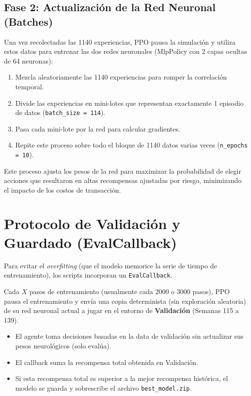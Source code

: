 \documentclass[12pt,a4paper]{article}
\begin{document}
\subsection{Fase 2: Actualización de la Red Neuronal (Batches)}
Una vez recolectadas las 1140 experiencias, PPO pausa la simulación y utiliza estos datos para entrenar las dos redes neuronales (MlpPolicy con 2 capas ocultas de 64 neuronas):
\begin{enumerate}
    \item Mezcla aleatoriamente las 1140 experiencias para romper la correlación temporal.
    \item Divide las experiencias en mini-lotes que representan exactamente 1 episodio de datos (\texttt{batch\_size = 114}).
    \item Pasa cada mini-lote por la red para calcular gradientes.
    \item Repite este proceso sobre todo el bloque de 1140 datos varias veces (\texttt{n\_epochs = 10}).
\end{enumerate}
Este proceso ajusta los pesos de la red para maximizar la probabilidad de elegir acciones que resultaron en altas recompensas ajustadas por riesgo, minimizando el impacto de los costos de transacción.

\section{Protocolo de Validación y Guardado (EvalCallback)}

Para evitar el \textit{overfitting} (que el modelo memorice la serie de tiempo de entrenamiento), los scripts incorporan un \texttt{EvalCallback}.

Cada $X$ pasos de entrenamiento (usualmente cada 2000 o 3000 pasos), PPO pausa el entrenamiento y envía una copia determinista (sin exploración aleatoria) de su red neuronal actual a jugar en el entorno de \textbf{Validación} (Semanas 115 a 139).

\begin{itemize}
    \item El agente toma decisiones basadas en la data de validación sin actualizar sus pesos neurológicos (solo evalúa).
    \item El callback suma la recompensa total obtenida en Validación.
    \item Si esta recompensa total es superior a la mejor recompensa histórica, el modelo se guarda y sobrescribe el archivo \texttt{best\_model.zip}.
\end{itemize}
\end{document}
